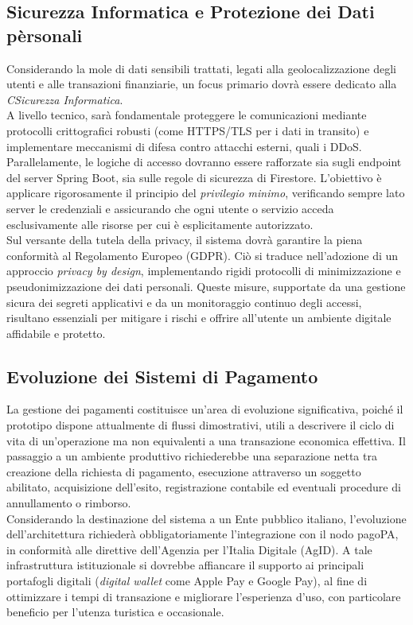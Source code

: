 \subsection*{Sicurezza Informatica e Protezione dei Dati pèrsonali}
Considerando la mole di dati sensibili trattati, legati alla geolocalizzazione degli utenti e alle transazioni finanziarie, un focus primario dovrà essere dedicato alla \textit{CSicurezza Informatica}. 
\\
A livello tecnico, sarà fondamentale proteggere le comunicazioni mediante protocolli crittografici robusti (come HTTPS/TLS per i dati in transito) e implementare meccanismi di difesa contro attacchi esterni, quali i DDoS. Parallelamente, le logiche di accesso dovranno essere rafforzate sia sugli endpoint del server Spring Boot, sia sulle regole di sicurezza di Firestore. L'obiettivo è applicare rigorosamente il principio del \emph{privilegio minimo}, verificando sempre lato server le credenziali e assicurando che ogni utente o servizio acceda esclusivamente alle risorse per cui è esplicitamente autorizzato.
\\
Sul versante della tutela della privacy, il sistema dovrà garantire la piena conformità al Regolamento Europeo (GDPR). Ciò si traduce nell'adozione di un approccio \emph{privacy by design}, implementando rigidi protocolli di minimizzazione e pseudonimizzazione dei dati personali. Queste misure, supportate da una gestione sicura dei segreti applicativi e da un monitoraggio continuo degli accessi, risultano essenziali per mitigare i rischi e offrire all'utente un ambiente digitale affidabile e protetto.

\subsection*{Evoluzione dei Sistemi di Pagamento}
La gestione dei pagamenti costituisce un'area di evoluzione significativa, poiché il prototipo dispone attualmente di flussi dimostrativi, utili a descrivere il ciclo di vita di un'operazione ma non equivalenti a una transazione economica effettiva. Il passaggio a un ambiente produttivo richiederebbe una separazione netta tra creazione della richiesta di pagamento, esecuzione attraverso un soggetto abilitato, acquisizione dell'esito, registrazione contabile ed eventuali procedure di annullamento o rimborso.
\\
Considerando la destinazione del sistema a un Ente pubblico italiano, l'evoluzione dell'architettura richiederà obbligatoriamente l'integrazione con il nodo pagoPA, in conformità alle direttive dell'Agenzia per l'Italia Digitale (AgID). A tale infrastruttura istituzionale si dovrebbe affiancare il supporto ai principali portafogli digitali (\textit{digital wallet} come Apple Pay e Google Pay), al fine di ottimizzare i tempi di transazione e migliorare l'esperienza d'uso, con particolare beneficio per l'utenza turistica e occasionale.

